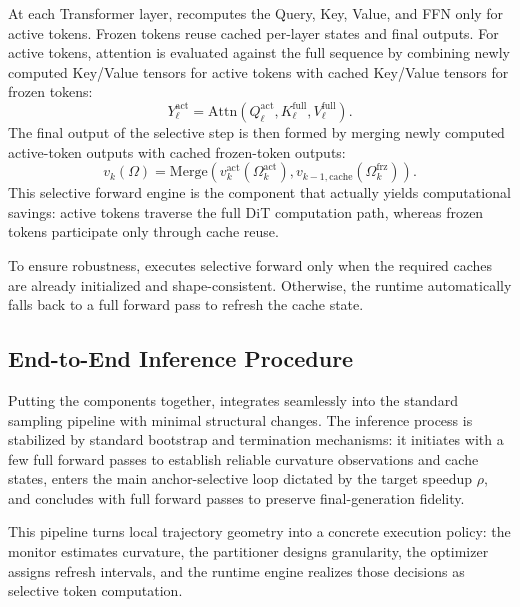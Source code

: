 At each Transformer layer, \cubic recomputes the Query, Key, Value, and FFN only for active tokens. Frozen tokens reuse cached per-layer states and final outputs. For active tokens, attention is evaluated against the full sequence by combining newly computed Key/Value tensors for active tokens with cached Key/Value tensors for frozen tokens:
\begin{equation}
    Y_\ell^{\mathrm{act}} =
    \mathrm{Attn}\!\left(
        Q_\ell^{\mathrm{act}},
        K_\ell^{\mathrm{full}},
        V_\ell^{\mathrm{full}}
    \right).
\end{equation}
The final output of the selective step is then formed by merging newly computed active-token outputs with cached frozen-token outputs:
\begin{equation}
    v_k(\Omega) =
    \mathrm{Merge}\!\left(
        v_k^{\mathrm{act}}(\Omega_k^{\mathrm{act}}),
        v_{k-1,\mathrm{cache}}(\Omega_k^{\mathrm{frz}})
    \right).
\end{equation}
This selective forward engine is the component that actually yields computational savings: active tokens traverse the full DiT computation path, whereas frozen tokens participate only through cache reuse.

To ensure robustness, \cubic executes selective forward only when the required caches are already initialized and shape-consistent. Otherwise, the runtime automatically falls back to a full forward pass to refresh the cache state.

\subsection{End-to-End Inference Procedure}
\label{sec:end2end}

Putting the components together, \cubic integrates seamlessly into the standard sampling pipeline with minimal structural changes. The inference process is stabilized by standard bootstrap and termination mechanisms: it initiates with a few full forward passes to establish reliable curvature observations and cache states, enters the main anchor-selective loop dictated by the target speedup $\rho$, and concludes with full forward passes to preserve final-generation fidelity. 

This pipeline turns local trajectory geometry into a concrete execution policy: the monitor estimates curvature, the partitioner designs granularity, the optimizer assigns refresh intervals, and the runtime engine realizes those decisions as selective token computation.